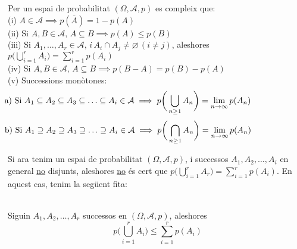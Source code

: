 \begin{prop}
  Per un espai de probabilitat $(\Omega, \mathcal{A}, p)$ es compleix que: \\
  (i) $A\in\mathcal{A} \implies p(\overline{A}) = 1-p(A)$ \\
  (ii) Si $A, B \in \mathcal{A},\, A \subseteq B \implies p(A)\leq p(B)$ \\
  (iii) Si $A_{1},\ldots,A_{r} \in \mathcal{A}, \, i \, A_{i}\cap A_{j} \not= \varnothing \, (i\not= j)$, aleshores $p\bigg(\bigcup\limits_{i=1}^{r}A_{i} \bigg) = \sum\limits_{i=1}^{r}p(A_{i})$ \\
  (iv) Si $A,B \in \mathcal{A}, \, A\subseteq B \implies p(B-A) = p(B)-p(A)$\\
  (v) Successions monòtones: 
  \[
    \hspace{-2.5cm}\text{a) Si } A_{1} \subseteq A_{2} \subseteq A_{3} \subseteq \ldots \subseteq A_{i} \in \mathcal{A} \implies p\bigg(\bigcup\limits_{n\geq1}A_{n}\bigg) = \lim_{n\to\infty}p(A_{n})
  \]
  \[
    \hspace{-2.5cm}\text{b) Si } A_{1} \supseteq A_{2} \supseteq A_{3} \supseteq \ldots \supseteq A_{i} \in \mathcal{A} \implies p\bigg(\bigcap\limits_{n\geq1}A_{n}\bigg) = \lim_{n\to\infty}p(A_{n})
  \]
\end{prop}

\newpage

Si ara tenim un espai de probabilitat $(\Omega, \mathcal{A},p)$, i successos $A_{1}, A_{2}, \ldots, A_{i}$ en general \underline{no} disjunts, aleshores \underline{no} és cert que  $p\bigg(\bigcup\limits_{i=1}^{r}A_{r} \bigg) = \sum\limits_{i=1}^{r}p(A_{i})$. En aquest cas, tenim la següent fita:
\begin{lema} \-\\
  Siguin $A_{1}, A_{2}, \ldots, A_{r}$ successos en $(\Omega, \mathcal{A},p)$, aleshores $$p\bigg(\bigcup\limits_{i=1}^{r}A_{i} \bigg) \leq \sum\limits_{i=1}^{r}p(A_{i})$$
\end{lema}

\begin{thm}
  
\end{thm}
